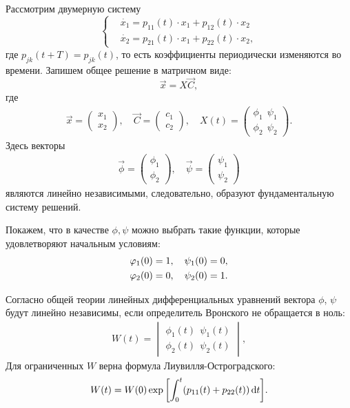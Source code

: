 Рассмотрим двумерную систему
\begin{equation}
	\left\{\begin{aligned}
		&\dot{x_1}=p_{11}(t)\cdot x_1+p_{12}(t)\cdot x_2 \\
		&\dot{x_2}=p_{21}(t)\cdot x_1+p_{22}(t)\cdot x_2,	
	\end{aligned}\right.
	\label{eq:47}
\end{equation}
где $p_{jk}(t+T)=p_{jk}(t)$, то есть  коэффициенты периодически изменяются во времени. Запишем общее решение в матричном виде:
\begin{equation*}
	\vec{x} = X \vec{C}, 
\end{equation*}
где
\begin{gather*}
	\vec{x}= 
	\begin{pmatrix}
		x_1 \\
		x_2
	\end{pmatrix}
	,\quad
	\vec{C}= 
	\begin{pmatrix}
		c_1 \\
		c_2
	\end{pmatrix}
	,\quad
	X(t)= 
	\begin{pmatrix}
		\phi_1 ~~  \psi_1 \\
		\phi_2  ~~ \psi_2
	\end{pmatrix}.
\end{gather*}
Здесь векторы
\begin{gather*}
	\vec{\phi}= 
	\begin{pmatrix}
		\phi_1 \\
		\phi_2
	\end{pmatrix}
	,\quad
	\vec{\psi}= 
	\begin{pmatrix}
		\psi_1 \\
		\psi_2
	\end{pmatrix}
\end{gather*}
являются линейно независимыми, следовательно, образуют фундаментальную систему решений. 

Покажем, что в качестве $\phi,\psi$ можно выбрать такие функции, которые удовлетворяют начальным условиям:
\begin{gather}
	\phi_1(0)=1,\quad \psi_1(0)=0, \notag \\ 
	\phi_2(0)=0,\quad \psi_2(0)=1.		
	\label{eq:48}
\end{gather}

Согласно общей теории линейных дифференциальных уравнений вектора $\phi$, $\psi$  будут линейно независимы, если определитель Вронского не обращается в ноль:
\begin{gather*}
	W(t)= 
	\begin{vmatrix}
		\phi_1(t) ~~\psi_1(t) \\ 
		\phi_2(t) ~~\psi_2(t)
	\end{vmatrix}
	,
\end{gather*}
Для ограниченных $W$ верна формула Лиувилля-Остроградского:
\begin{equation}
	W(t)=W(0)\exp\qty[\int_0^t(p_{11}(t)+p_{22}(t))\dd{t}].
	\label{eq:49}	
\end{equation}

